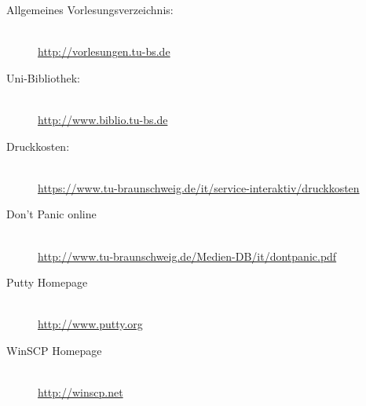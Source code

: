\begin{multicols}{2}
	\begin{description}
		\item[Allgemeines Vorlesungsverzeichnis:] ~\\
			{\footnotesize\url{http://vorlesungen.tu-bs.de}}
		\item[Uni-Bibliothek:] ~\\
			{\footnotesize\url{http://www.biblio.tu-bs.de}}
		\item[Druckkosten:] ~\\
			{\footnotesize\url{https://www.tu-braunschweig.de/it/service-interaktiv/druckkosten}}
		\item[Don't Panic online] ~\\
			{\footnotesize\url{http://www.tu-braunschweig.de/Medien-DB/it/dontpanic.pdf}}
		\item[Putty Homepage] ~\\
			{\footnotesize\url{http://www.putty.org}}
		\item[WinSCP Homepage] ~\\
			{\footnotesize\url{http://winscp.net}}
	\end{description}
\end{multicols}